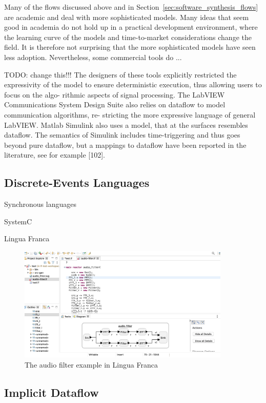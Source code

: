 Many of the flows discussed above and in Section~\ref{sec:software_synthesis_flows} are academic and deal with more sophisticated models. 
Many ideas that seem good in academia do not hold up in a practical development environment, where the learning curve of the models and time-to-market considerations change the field.
It is therefore not surprising that the more sophisticated models have seen less adoption.
Nevertheless, some commercial tools do ...


TODO: change this!!! 
The designers of these tools explicitly restricted the expressivity of the model
to ensure deterministic execution, thus allowing users to focus on the algo-
rithmic aspects of signal processing. The LabVIEW Communications System
Design Suite also relies on dataflow to model communication algorithms, re-
stricting the more expressive language of general LabVIEW. Matlab Simulink
also uses a model, that at the surfaces resembles dataflow. The semantics of
Simulink includes time-triggering and thus goes beyond pure dataflow, but a
mappings to dataflow have been reported in the literature, see for example
[102].

\subsection{Discrete-Events Languages}

Synchronous languages

SystemC

Lingua Franca
\begin{figure}[t]
	\centering
	\includegraphics[width=0.9\textwidth]{figures/audio_filter_lf_screenshot.png}
	\caption{The audio filter example in Lingua Franca}
	\label{fig:audio_filter_lf}
\end{figure}


\subsection{Implicit Dataflow}

